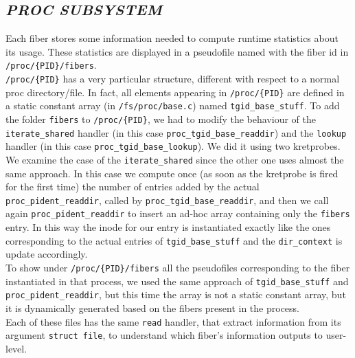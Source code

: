 \documentclass[a4paper]{article}
\begin{document}
\subsection*{\textit{PROC SUBSYSTEM}}
Each fiber stores some information needed to compute runtime statistics about its usage. These statistics are displayed in a pseudofile named with the fiber id in \texttt{/proc/\{PID\}/fibers}.\bigskip\\
\texttt{/proc/\{PID\}} has a very particular structure, different with respect to a normal proc directory/file. In fact, all elements appearing in \texttt{/proc/\{PID\}} are defined in a static constant array (in \texttt{/fs/proc/base.c}) named \texttt{tgid\_base\_stuff}.
To add the folder \texttt{fibers} to \texttt{/proc/\{PID\}}, we had to modify the behaviour of the \texttt{iterate\_shared} handler (in this case \texttt{proc\_tgid\_base\_readdir}) and the \texttt{lookup} handler (in this case \texttt{proc\_tgid\_base\_lookup}). We did it using two kretprobes.\bigskip\\
We examine the case of the \texttt{iterate\_shared} since the other one uses almost the same approach. In this case we compute once (as soon as the kretprobe is fired for the first time) the number of entries added by the actual \texttt{proc\_pident\_readdir}, called by \texttt{proc\_tgid\_base\_readdir}, and then we call again \texttt{proc\_pident\_readdir} to insert an ad-hoc array containing only the \texttt{fibers} entry. In this way the inode for our entry is instantiated exactly like the ones corresponding to the actual entries of \texttt{tgid\_base\_stuff} and the \texttt{dir\_context} is update accordingly.\bigskip\\
To show under \texttt{/proc/\{PID\}/fibers} all the pseudofiles corresponding to the fiber instantiated in that process, we used the same approach of \texttt{tgid\_base\_stuff} and \texttt{proc\_pident\_readdir}, but this time the array is not a static constant array, but it is dynamically generated based on the fibers present in the process.\bigskip\\
Each of these files has the same \texttt{read} handler, that extract information from its argument \texttt{struct file}, to understand which fiber's information outputs to user-level.
\end{document}
